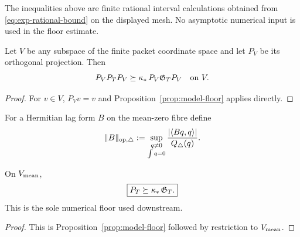 \begin{remark}
The inequalities above are finite rational interval calculations obtained from
\eqref{eq:exp-rational-bound} on the displayed mesh.  No asymptotic numerical
input is used in the floor estimate.
\end{remark}

\begin{lemma}
\label{lem:model-compression}
Let $V$ be any subspace of the finite packet coordinate space and let $P_V$ be
its orthogonal projection. Then
\[
P_VP_TP_V\succeq\kappa_*\,P_V\mathfrak G_TP_V
\quad\text{on }V.
\]
\end{lemma}

\begin{proof}
For $v\in V$, $P_Vv=v$ and Proposition~\ref{prop:model-floor} applies directly.
\end{proof}

For a Hermitian lag form $B$ on the mean-zero fibre define
\begin{equation}
\|B\|_{\operatorname{op},\triangle}
:=\sup_{\substack{q\ne0\\ \int q=0}}
\frac{|\langle Bq,q\rangle|}{Q_\triangle(q)}.
\label{eq:triangular-form-norm}
\end{equation}

\begin{proposition}
\label{prop:finiteT-principal-comparison}
On $V_{\rm mean}$,
\begin{equation}
\boxed{P_T\succeq\kappa_*\,\mathfrak G_T.}
\label{eq:principal-floor}
\end{equation}
This is the sole numerical floor used downstream.
\end{proposition}

\begin{proof}
This is Proposition~\ref{prop:model-floor} followed by restriction to
$V_{\rm mean}$.
\end{proof}

